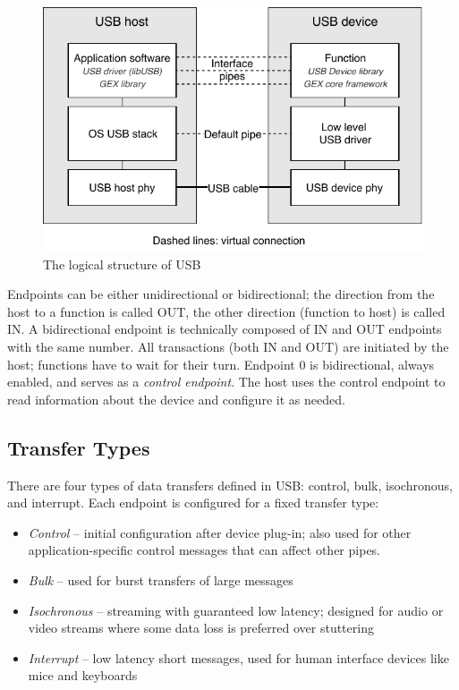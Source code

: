 \begin{figure}[h]
	\centering
	\includegraphics[scale=1] {img/usb-logical-redraw.pdf}
	\caption{\label{fig:usb-logical}The logical structure of USB}
\end{figure}

Endpoints can be either unidirectional or bidirectional; the direction from the host to a function is called OUT, the other direction (function to host) is called IN. A bidirectional endpoint is technically composed of IN and OUT endpoints with the same number. All transactions (both IN and OUT) are initiated by the host; functions have to wait for their turn. Endpoint 0 is bidirectional, always enabled, and serves as a \textit{control endpoint}. The host uses the control endpoint to read information about the device and configure it as needed.

\subsection{Transfer Types}

There are four types of data transfers defined in \gls{USB}: control, bulk, isochronous, and interrupt. Each endpoint is configured for a fixed transfer type:

\begin{itemize}
	\item \textit{Control} -- initial configuration after device plug-in; also used for other application-specific control messages that can affect other pipes.
	\item \textit{Bulk} -- used for burst transfers of large messages
	\item \textit{Isochronous} -- streaming with guaranteed low latency; designed for audio or video streams where some data loss is preferred over stuttering
	\item \textit{Interrupt} -- low latency short messages, used for human interface devices like mice and keyboards
\end{itemize}

